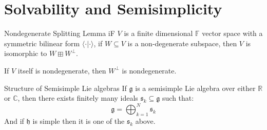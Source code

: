 \section{Solvability and Semisimplicity}
    \begin{ltheorem}{Nondegenerate Splitting Lemma}{}
        iF $V$ is a finite dimensional $\mathbb{F}$ vector space with a
        symmetric bilinear form $\langle\cdot|\cdot\rangle$, if
        $W\subseteq{V}$ is a non-degenerate subspace, then
        $V$ is isomorphic to $W\boxplus{W}^{\perp}$.
    \end{ltheorem}
    If $V$ itself is nondegenerate, then $W^{\perp}$ is nondegenerate.
    \begin{ltheorem}{Structure of Semisimple Lie algebras}{}
        If $\mathfrak{g}$ is a semisimple Lie algebra over either
        $\mathbb{R}$ or $\mathbb{C}$, then there exists finitely many ideals
        $\mathfrak{s}_{k}\subseteq\mathfrak{g}$ such that:
        \begin{equation}
            \mathfrak{g}=\bigoplus_{k=1}^{N}\mathfrak{s}_{k}
        \end{equation}
        And if $\mathfrak{h}$ is simple then it is one of the
        $\mathfrak{s}_{k}$ above.
    \end{ltheorem}
